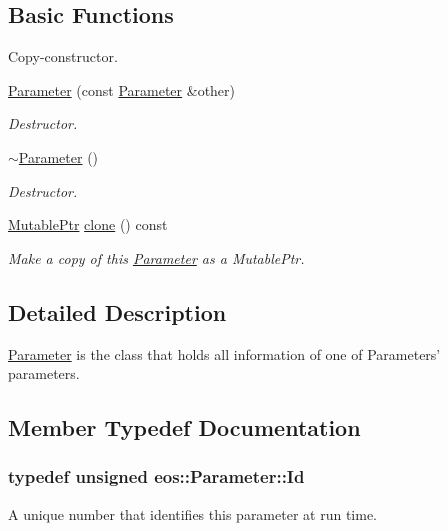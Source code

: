 \subsection*{Basic Functions}
\label{_amgrp2386c9a1f1785edee33f374dd2db9b3d}
 Copy-\/constructor. \begin{DoxyCompactItemize}
\item 
\hyperlink{classeos_1_1Parameter_ac64d342eed9e01a93a42e00403ab041f}{Parameter} (const \hyperlink{classeos_1_1Parameter}{Parameter} \&other)
\begin{DoxyCompactList}\small\item\em Destructor. \item\end{DoxyCompactList}\item 
\hyperlink{classeos_1_1Parameter_ac5e6dd06494095cffe292e4b4dc200c8}{$\sim$Parameter} ()
\begin{DoxyCompactList}\small\item\em Destructor. \item\end{DoxyCompactList}\item 
\hyperlink{namespaceeos_a0ab446e6a801d96a1ee83bb7c070686f}{MutablePtr} \hyperlink{classeos_1_1Parameter_a8a643807f254a9601349c779cf6211dc}{clone} () const 
\begin{DoxyCompactList}\small\item\em Make a copy of this \hyperlink{classeos_1_1Parameter}{Parameter} as a MutablePtr. \item\end{DoxyCompactList}\end{DoxyCompactItemize}


\subsection{Detailed Description}
\hyperlink{classeos_1_1Parameter}{Parameter} is the class that holds all information of one of Parameters' parameters. 

\subsection{Member Typedef Documentation}
\hypertarget{classeos_1_1Parameter_a065f55e66b2128cc5f14339e676d833a}{
\subsubsection[{Id}]{\setlength{\rightskip}{0pt plus 5cm}typedef unsigned {\bf eos::Parameter::Id}}}
\label{classeos_1_1Parameter_a065f55e66b2128cc5f14339e676d833a}
A unique number that identifies this parameter at run time. 

